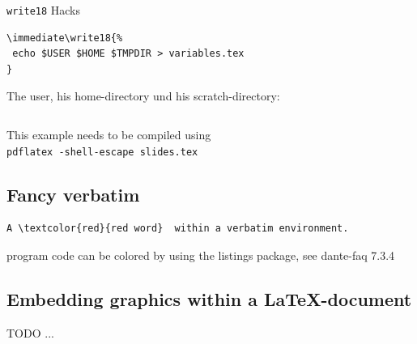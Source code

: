 \documentclass[11pt,a4paper,landscape]{article}
\begin{document}
\NewPage\centerline{\texttt{write18} Hacks}
\vfill
\begin{verbatim}
\immediate\write18{% 
 echo $USER $HOME $TMPDIR > variables.tex
}
\end{verbatim}
The user, his home-directory und his scratch-directory:
\begin{verbatim}

\end{verbatim}
\ifpdf
\immediate{}
\alert{}
\else
\vfill
This example needs to be compiled using \\ \alert{\texttt{pdflatex -shell-escape slides.tex}}
\fi
\vfill


\NewPage\subsection{Fancy verbatim}
\vfill
\begin{Verbatim}[commandchars=\\\{\}] 
  A \textcolor{red}{red word}  within a verbatim environment. 
\end{Verbatim} 
\vfill
program code can be colored by using the listings package, see dante-faq 7.3.4
\vfill

\NewPage\subsection{Embedding graphics within a \LaTeX-document}
\begin{block}
  TODO ...  
\end{block}
\end{document}
